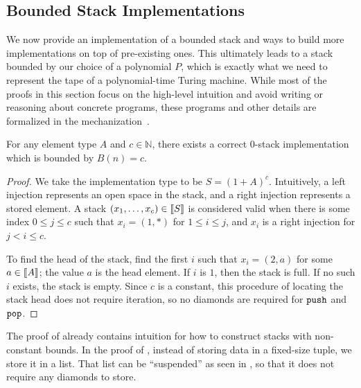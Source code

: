 \subsection{Bounded Stack Implementations}
\label{sec:completeness-bounded-stack-implementation}

We now provide an implementation of a bounded stack and ways to build more implementations on top of pre-existing ones.
%
This ultimately leads to a stack bounded by our choice
of a polynomial $P$, which is exactly what we need to represent the
tape of a polynomial-time Turing machine.
%
While most of the proofs in this section focus on the high-level
intuition and avoid writing or reasoning about concrete \lfpl
programs, these programs and other details are formalized in the mechanization~\cite{mechanization}.

\begin{lemma}
\label{lem:stack-constant}
For any element type $A$ and $c \in \mathbb N$, there exists a correct $0$-stack implementation which is bounded by $B(n) = c$.
\end{lemma}
\begin{proof}
We take the implementation type to be $S = (1 + A)^c$. Intuitively, a left injection represents an open space in the stack, and a right injection represents a stored element. A stack $(x_1, \ldots, x_c) \in \llbracket S \rrbracket$ is considered valid when there is some index $0 \le j \le c$ such that $x_i = (1, \ast)$ for $1 \le i \le j$, and $x_i$ is a right injection for $j < i \le c$. %

To find the head of the stack, find the first $i$ such that $x_i = (2, a)$ for some $a \in \llbracket A \rrbracket$; the value $a$ is the head element. If $i$ is $1$, then the stack is full. If no such $i$ exists, the stack is empty. Since $c$ is a constant, this procedure of locating the stack head does not require iteration, so no diamonds are required for $\mathtt{push}$ and $\mathtt{pop}$.
\end{proof}

The proof of  already contains intuition for how to construct stacks with non-constant bounds. 
In the proof of , instead of storing data in a fixed-size tuple, we store it in a list. That list can be ``suspended'' as seen in , so that it does not require any diamonds to store.

